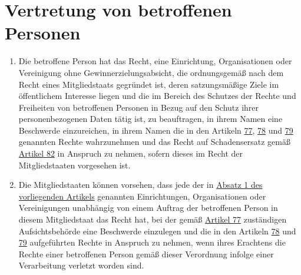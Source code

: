 \chapter{Vertretung von betroffenen Personen}
\label{ch:80}


\begin{enumerate}

  \item Die betroffene Person hat das Recht, eine Einrichtung, Organisationen oder Vereinigung ohne
   Gewinnerzielungsabsicht, die ordnungsgemäß nach dem Recht eines Mitgliedstaats gegründet ist, deren satzungsmäßige
   Ziele im öffentlichem Interesse liegen und die im Bereich des Schutzes der Rechte und Freiheiten von betroffenen
   Personen in Bezug auf den Schutz ihrer personenbezogenen Daten tätig ist, zu beauftragen, in ihrem Namen eine
   Beschwerde einzureichen, in ihrem Namen die in den Artikeln \hyperref[ch:77]{77}, \hyperref[ch:78]{78} und \hyperref
   [ch:79]{79} genannten Rechte wahrzunehmen und das Recht auf Schadensersatz gemäß \hyperref[ch:82]{Artikel 82} in
   Anspruch zu nehmen, sofern dieses im Recht der Mitgliedstaaten vorgesehen ist.
  \label{itm:80-1}

  \item Die Mitgliedstaaten können vorsehen, dass jede der in \hyperref[itm:80-1]{Absatz 1 des vorliegenden Artikels}
   genannten Einrichtungen, Organisationen oder Vereinigungen unabhängig von einem Auftrag der betroffenen Person in
   diesem Mitgliedstaat das Recht hat, bei der gemäß \hyperref[ch:77]{Artikel 77} zuständigen Aufsichtsbehörde eine
   Beschwerde einzulegen und die in den Artikeln \hyperref[ch:78]{78} und \hyperref[ch:79]{79} aufgeführten Rechte in
   Anspruch zu nehmen, wenn ihres Erachtens die Rechte einer betroffenen Person gemäß dieser Verordnung infolge einer
   Verarbeitung verletzt worden sind.
  \label{itm:80-2}

\end{enumerate}


